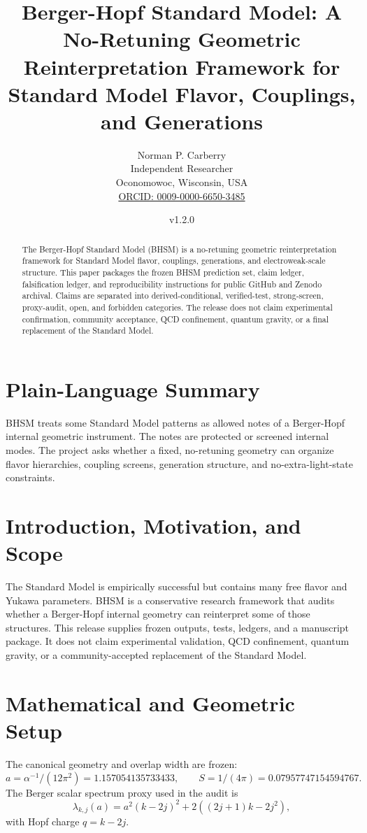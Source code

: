 \documentclass[11pt]{article}
\title{Berger-Hopf Standard Model: A No-Retuning Geometric Reinterpretation Framework for Standard Model Flavor, Couplings, and Generations}
\author{Norman P. Carberry\\Independent Researcher\\Oconomowoc, Wisconsin, USA\\\href{https://orcid.org/0009-0000-6650-3485}{ORCID: 0009-0000-6650-3485}}
\date{v1.2.0}
\begin{document}
\maketitle

\begin{abstract}
The Berger-Hopf Standard Model (BHSM) is a no-retuning geometric reinterpretation framework for Standard Model flavor, couplings, generations, and electroweak-scale structure. This paper packages the frozen BHSM prediction set, claim ledger, falsification ledger, and reproducibility instructions for public GitHub and Zenodo archival. Claims are separated into derived-conditional, verified-test, strong-screen, proxy-audit, open, and forbidden categories. The release does not claim experimental confirmation, community acceptance, QCD confinement, quantum gravity, or a final replacement of the Standard Model.
\end{abstract}

\section{Plain-Language Summary}
BHSM treats some Standard Model patterns as allowed notes of a Berger-Hopf internal geometric instrument. The notes are protected or screened internal modes. The project asks whether a fixed, no-retuning geometry can organize flavor hierarchies, coupling screens, generation structure, and no-extra-light-state constraints.

\section{Introduction, Motivation, and Scope}
The Standard Model is empirically successful but contains many free flavor and Yukawa parameters. BHSM is a conservative research framework that audits whether a Berger-Hopf internal geometry can reinterpret some of those structures. This release supplies frozen outputs, tests, ledgers, and a manuscript package. It does not claim experimental validation, QCD confinement, quantum gravity, or a community-accepted replacement of the Standard Model.

\section{Mathematical and Geometric Setup}
The canonical geometry and overlap width are frozen:
\[
a=\alpha^{-1}/(12\pi^2)=1.157054135733433,\qquad
S=1/(4\pi)=0.07957747154594767.
\]
The Berger scalar spectrum proxy used in the audit is
\[
\lambda_{k,j}(a)=a^2(k-2j)^2+2((2j+1)k-2j^2),
\]
with Hopf charge \(q=k-2j\).
\end{document}
